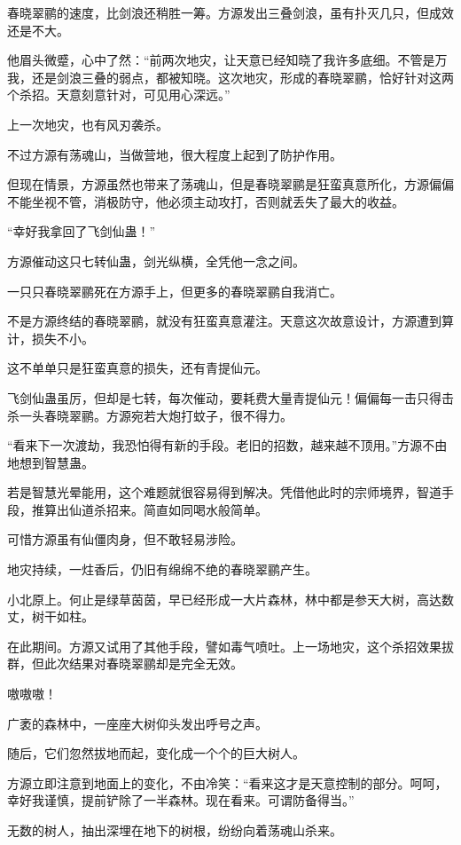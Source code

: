 \begin{this_body}
春晓翠鹂的速度，比剑浪还稍胜一筹。方源发出三叠剑浪，虽有扑灭几只，但成效还是不大。

他眉头微蹙，心中了然：“前两次地灾，让天意已经知晓了我许多底细。不管是万我，还是剑浪三叠的弱点，都被知晓。这次地灾，形成的春晓翠鹂，恰好针对这两个杀招。天意刻意针对，可见用心深远。”

上一次地灾，也有风刃袭杀。

不过方源有荡魂山，当做营地，很大程度上起到了防护作用。

但现在情景，方源虽然也带来了荡魂山，但是春晓翠鹂是狂蛮真意所化，方源偏偏不能坐视不管，消极防守，他必须主动攻打，否则就丢失了最大的收益。

“幸好我拿回了飞剑仙蛊！”

方源催动这只七转仙蛊，剑光纵横，全凭他一念之间。

一只只春晓翠鹂死在方源手上，但更多的春晓翠鹂自我消亡。

不是方源终结的春晓翠鹂，就没有狂蛮真意灌注。天意这次故意设计，方源遭到算计，损失不小。

这不单单只是狂蛮真意的损失，还有青提仙元。

飞剑仙蛊虽厉，但却是七转，每次催动，要耗费大量青提仙元！偏偏每一击只得击杀一头春晓翠鹂。方源宛若大炮打蚊子，很不得力。

“看来下一次渡劫，我恐怕得有新的手段。老旧的招数，越来越不顶用。”方源不由地想到智慧蛊。

若是智慧光晕能用，这个难题就很容易得到解决。凭借他此时的宗师境界，智道手段，推算出仙道杀招来。简直如同喝水般简单。

可惜方源虽有仙僵肉身，但不敢轻易涉险。

地灾持续，一炷香后，仍旧有绵绵不绝的春晓翠鹂产生。

小北原上。何止是绿草茵茵，早已经形成一大片森林，林中都是参天大树，高达数丈，树干如柱。

在此期间。方源又试用了其他手段，譬如毒气喷吐。上一场地灾，这个杀招效果拔群，但此次结果对春晓翠鹂却是完全无效。

嗷嗷嗷！

广袤的森林中，一座座大树仰头发出呼号之声。

随后，它们忽然拔地而起，变化成一个个的巨大树人。

方源立即注意到地面上的变化，不由冷笑：“看来这才是天意控制的部分。呵呵，幸好我谨慎，提前铲除了一半森林。现在看来。可谓防备得当。”

无数的树人，抽出深埋在地下的树根，纷纷向着荡魂山杀来。


\end{this_body}
